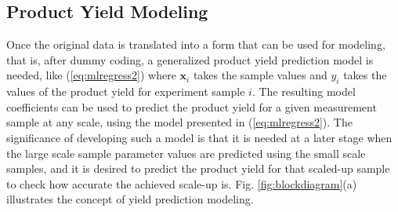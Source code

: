 \documentclass{article}
\begin{document}
%

\subsection{Product Yield Modeling}
\label{ssec:yieldmodeling} 

Once the original data is translated into a form that can be used for modeling, that is, after dummy coding, a generalized product yield prediction model is needed, like (\ref{eq:mlregress2}) where $\mathbf{x}_i$ takes the sample values and $y_i$ takes the values of the product yield for experiment sample $i$. The resulting model coefficients can be used to predict the product yield for a given measurement sample at any scale, using the model presented in (\ref{eq:mlregress2}). The significance of developing such a model is that it is needed at a later stage when the large scale sample parameter values are predicted using the small scale samples, and it is desired to predict the product yield for that scaled-up sample to check how accurate the achieved scale-up is. Fig. \ref{fig:blockdiagram}(a) illustrates the concept of yield prediction modeling.
\end{document}
